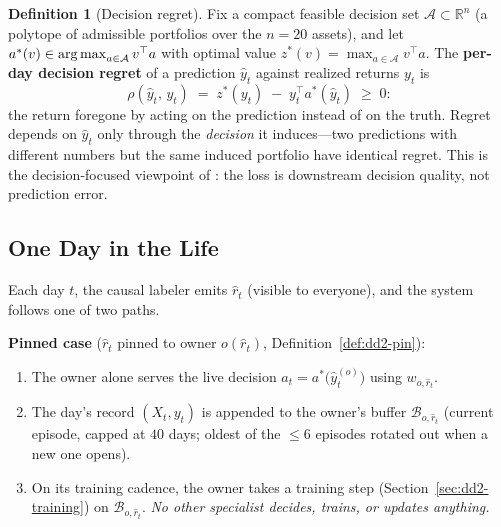 \documentclass[11pt,a4paper]{article}
\theoremstyle{definition}
\newtheorem{definition}{Definition}[section]
\theoremstyle{plain}
\newcommand{\R}{\mathbb{R}}
\newcommand{\argmax}{\operatornamewithlimits{arg\,max}}
\begin{document}
\begin{definition}[Decision regret]
\label{def:dd2-regret}
Fix a compact feasible decision set $\mathcal{A} \subset \R^{n}$ (a polytope
of admissible portfolios over the $n = 20$ assets), and let
$a^{*}(v) \in \argmax_{a \in \mathcal{A}} v^{\top} a$ with optimal value
$z^{*}(v) = \max_{a \in \mathcal{A}} v^{\top} a$. The \textbf{per-day
decision regret} of a prediction $\hat y_t$ against realized returns $y_t$ is
\begin{equation}
\label{eq:dd2-regret}
\rho(\hat y_t,\, y_t) \;=\; z^{*}(y_t) \;-\; y_t^{\top} a^{*}(\hat y_t)
\;\ge\; 0:
\end{equation}
the return foregone by acting on the prediction instead of on the truth.
Regret depends on $\hat y_t$ only through the \emph{decision} it induces---two
predictions with different numbers but the same induced portfolio have
identical regret. This is the decision-focused viewpoint of
\citet{elmachtoub2022smart}: the loss is downstream decision quality, not
prediction error.
\end{definition}

\subsection{One Day in the Life}

Each day $t$, the causal labeler emits $\hat r_t$ (visible to everyone), and
the system follows one of two paths.

\textbf{Pinned case} ($\hat r_t$ pinned to owner $o(\hat r_t)$,
Definition~\ref{def:dd2-pin}):
\begin{enumerate}
  \item The owner alone serves the live decision
        $a_t = a^{*}\bigl(\hat y^{(o)}_t\bigr)$ using $w_{o, \hat r_t}$.
  \item The day's record $(X_t, y_t)$ is appended to the owner's buffer
        $\mathcal{B}_{o, \hat r_t}$ (current episode, capped at $40$ days;
        oldest of the $\le 6$ episodes rotated out when a new one opens).
  \item On its training cadence, the owner takes a training step
        (Section~\ref{sec:dd2-training}) on $\mathcal{B}_{o, \hat r_t}$.
        \emph{No other specialist decides, trains, or updates anything.}
\end{enumerate}
\end{document}
